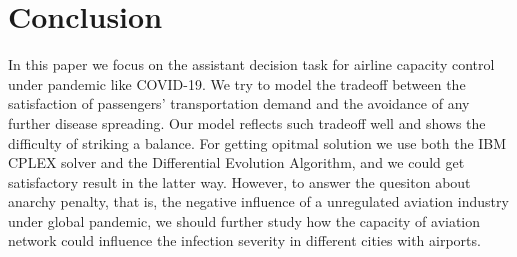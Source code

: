 \section{Conclusion}
In this paper we focus on the assistant decision task for airline capacity control under pandemic like COVID-19. We try to model the tradeoff between the satisfaction of passengers' transportation demand and the avoidance of any further disease spreading. Our model reflects such tradeoff well and shows the difficulty of striking a balance. For getting opitmal solution we use both the IBM CPLEX solver and the Differential Evolution Algorithm, and we could get satisfactory result in the latter way. However, to answer the quesiton about anarchy penalty, that is, the negative influence of a unregulated aviation industry under global pandemic, we should further study how the capacity of aviation network could influence the infection severity in different cities with airports.


